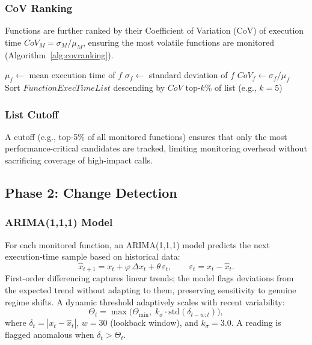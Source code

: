 \documentclass[pdflatex,sn-nature]{sn-jnl}
\theoremstyle{thmstyleone}%
\begin{document}
\subsubsection{CoV Ranking}
Functions are further ranked by their Coefficient of Variation (CoV) of
execution time $CoV_M = \sigma_M / \mu_M$, ensuring the most volatile
functions are monitored (Algorithm~\ref{alg:covranking}).

\begin{algorithm}[tbp]
  \caption{CoV Ranking of Function Calls}\label{alg:covranking}
  \begin{algorithmic}[1]
      \State $\mu_f \leftarrow$ mean execution time of $f$
      \State $\sigma_f \leftarrow$ standard deviation of $f$
      \State $CoV_f \leftarrow \sigma_f / \mu_f$
    \EndFor
    \State Sort $FunctionExecTimeList$ descending by $CoV$
    \State \Return top-$k\%$ of list (e.g., $k=5$)
  \end{algorithmic}
\end{algorithm}

\subsubsection{List Cutoff}
A cutoff (e.g., top-5\% of all monitored functions) ensures that only the
most performance-critical candidates are tracked, limiting monitoring overhead
without sacrificing coverage of high-impact calls.

\subsection{Phase 2: Change Detection}\label{sec:framework:phase2}

\subsubsection{ARIMA(1,1,1) Model}
For each monitored function, an ARIMA(1,1,1) model predicts the next
execution-time sample based on historical data:
\begin{equation}
  \hat{x}_{t+1} = x_t + \varphi\,\Delta x_t + \theta\,\varepsilon_t,
  \qquad \varepsilon_t = x_t - \hat{x}_t.
  \label{eq:arima}
\end{equation}
First-order differencing captures linear trends; the model flags deviations
from the expected trend without adapting to them, preserving sensitivity to
genuine regime shifts.
A dynamic threshold adaptively scales with recent variability:
\begin{equation}
  \Theta_t = \max\!\bigl(\Theta_{\min},\; k_\sigma \cdot
  \mathrm{std}(\delta_{t-w:t})\bigr),
  \label{eq:dyn_thresh}
\end{equation}
where $\delta_t = |x_t - \hat{x}_t|$, $w = 30$ (lookback window), and
$k_\sigma = 3.0$.
A reading is flagged anomalous when $\delta_t > \Theta_t$.
\end{document}
